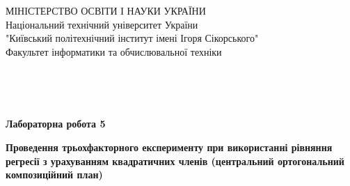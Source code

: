 \begin{titlepage}
     \begin{center}
      {\selectfont МІНІСТЕРСТВО ОСВІТИ І НАУКИ УКРАЇНИ} \\
      Національний технічний університет України
      \\ "Київський політехнічний інститут імені Ігоря Сікорського"
      \\ Факультет інформатики та обчислювальної техніки
     \end{center}  

    $\;$
    
    $\;$
    
    $\;$
    
    $\;$
    
    $\;$
    
    \vspace{0.5cm}
    \begin{center}
     {\large\textbf{Лабораторна робота 5}\par}
     \vspace{0.5cm}
     \textbf{Проведення трьохфакторного експерименту при використанні рівняння регресії з урахуванням квадратичних членів
     (центральний ортогональний композиційний план)}
    \end{center}
    \vspace{2.5cm}


\end{titlepage}
